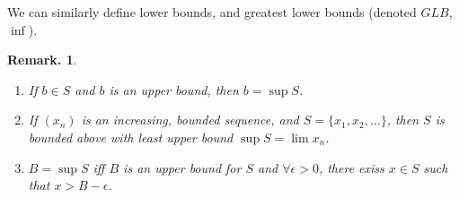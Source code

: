 \documentclass[11pt, a4paper]{memoir}
\theoremstyle{change}
\theoremstyle{plain}
\theoremstyle{nonumberplain}
\newtheorem{remark}{Remark.}
\numberwithin{equation}{section}
\begin{document}
We can similarly define lower bounds, and greatest lower bounds (denoted $GLB$, $\inf$).
\begin{remark}\hspace{1cm}
    \begin{enumerate}
        \item If $b\in S$ and $b$ is an upper bound, then $b=\sup S$.
        \item If $(x_n)$ is an increasing, bounded sequence, and $S=\{x_1,x_2,\ldots\}$, then $S$ is bounded above with
            least upper bound $\sup S=\lim x_n$.
            \begin{center}
            \end{center}
        \item $B=\sup S$ iff $B$ is an upper bound for $S$ and $\forall\epsilon>0$, there exiss $x\in S$ such that $x>B-\epsilon$.
    \end{enumerate}
\end{remark}
\end{document}
